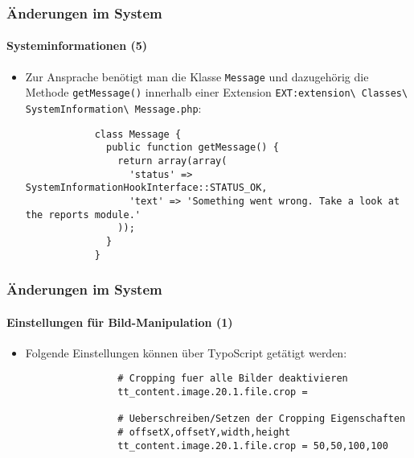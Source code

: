 \begin{frame}[fragile]
	\frametitle{Änderungen im System}
	\framesubtitle{Systeminformationen (5)}

	\lstset{basicstyle=\tiny\ttfamily}

	\begin{itemize}
		\item Zur Ansprache benötigt man die Klasse \texttt{Message} und dazugehörig die Methode
			\texttt{getMessage()} innerhalb einer Extension
			\small
				\texttt{EXT:extension\textbackslash
					Classes\textbackslash
					SystemInformation\textbackslash
					Message.php}:
			\normalsize

		\begin{lstlisting}
			class Message {
			  public function getMessage() {
			    return array(array(
			      'status' => SystemInformationHookInterface::STATUS_OK,
			      'text' => 'Something went wrong. Take a look at the reports module.'
			    ));
			  }
			}
		\end{lstlisting}

	\end{itemize}

\end{frame}


\begin{frame}[fragile]
	\frametitle{Änderungen im System}
	\framesubtitle{Einstellungen für Bild-Manipulation (1)}

	\begin{itemize}
		\item Folgende Einstellungen können über TypoScript getätigt werden:
			\begin{lstlisting}
				# Cropping fuer alle Bilder deaktivieren
				tt_content.image.20.1.file.crop =

				# Ueberschreiben/Setzen der Cropping Eigenschaften
				# offsetX,offsetY,width,height
				tt_content.image.20.1.file.crop = 50,50,100,100
			\end{lstlisting}

	\end{itemize}

\end{frame}

